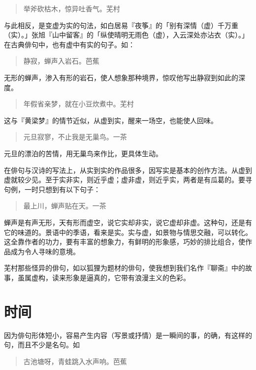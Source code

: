 {\begin{quote}
        举斧砍枯木，惊异吐香气。\hfill 芜村
    \end{quote}

    与此相反，是变虚为实的句法，如白居易『夜筝』的「别有深情（虚）千万重（实）。」张旭『山中留客』的「纵使晴明无雨色（虚），入云深处亦沾衣（实）。」在古典俳句中，也有虚中有实的句子。如：

    \begin{quote}
        静寂，蝉声入岩石。\hfill 芭蕉
    \end{quote}

    无形的蝉声，渗入有形的岩石，使人想象那种境界，惊叹他写出静寂到如此的深度。

    \begin{quote}
        年假省亲梦，就在小豆炊煮中。\hfill 芜村
    \end{quote}

    这与『黄梁梦』的情节近似，从虚到实，醒来一场空，也能使人回味。

    \begin{quote}
        元旦寂寥，不止我是无巢鸟。\hfill 一茶
    \end{quote}

    元旦的漂泊的苦情，用无巢鸟来作比，更具体生动。

    在俳句与汉诗的写法上，从实到实的作品很多，因写实是基本的创作方法。从虚到虚就较少见。至于实非实，则近乎虚；虚非虚，则近乎实，两者是有瓜葛的。要寻句例，一时只想到有以下句子：

    \begin{quote}
        最上川，蝉声贴在天。\hfill 一茶
    \end{quote}

    蝉声是有声无形，天有形而虚空，说它实却非实，说它虚却非虚。这种句，还是有它的味道的。景语中的季语，看来是实。实与虚，如景物与情思交融，可以转化。这全靠作者的功力，要有丰富的想象力，有鲜明的形象感，巧妙的排比组合，使作品成为令人寻味的意境。

    芜村那些怪异的俳句，如以狐狸为题材的俳句，使我想到我们名作『聊斋』中的故事，虽属虚构，读来形象是逼真的，它带有浪漫主义的色彩。

    \section*{\FS 时间}

    因为俳句形体短小，容易产生内容（写景或抒情）是一瞬间的事，的确，有这样的句，而且不少是名句。如

    \begin{quote}
        古池塘呀，青蛙跳入水声响。\hfill 芭蕉
    \end{quote}

}
